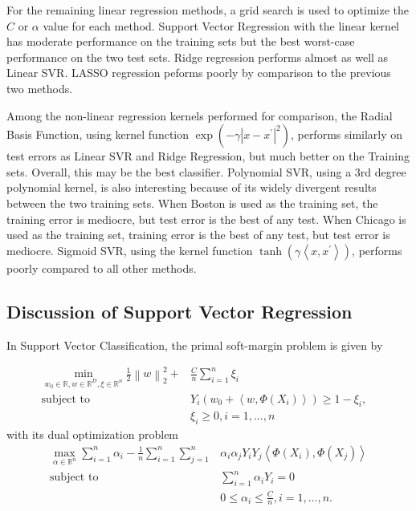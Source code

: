 \documentclass{article}
\begin{document}
For the remaining linear regression methods, a grid search is used to optimize the $C$ or $\alpha$ value for each method. Support Vector Regression with the linear kernel has moderate performance on the training sets but the best worst-case performance on the two test sets. Ridge regression performs almost as well as Linear SVR. LASSO regression peforms poorly by comparison to the previous two methods.

Among the non-linear regression kernels performed for comparison, the Radial Basis Function, using kernel function $\exp\left(-\gamma\left|x-x^\prime\right|^2\right)$, performs similarly on test errors as Linear SVR and Ridge Regression, but much better on the Training sets. Overall, this may be the best classifier. Polynomial SVR, using a 3rd degree polynomial kernel, is also interesting because of its widely divergent results between the two training sets. When Boston is used as the training set, the training error is mediocre, but test error is the best of any test. When Chicago is used as the training set, training error is the best of any test, but test error is mediocre. Sigmoid SVR, using the kernel function $\tanh\left(\gamma\left<x, x^\prime\right>\right)$, performs poorly compared to all other methods. 

\subsection{Discussion of Support Vector Regression}

In Support Vector Classification, the primal soft-margin problem is given by 

\begin{align*}
\min_{w_0\in\mathbb{R}, w\in\mathbb{R}^D, \xi\in\mathbb{R}^n}\frac{1}{2}\left\lVert w\right\rVert_2^2 + &\frac{C}{n}\sum_{i=1}^n\xi_i& \\ 
\text{subject to }&Y_i\left(w_0 + \left<w,\Phi(X_i)\right>\right) \geq 1 - \xi_i, \\
&\xi_i\geq 0, i = 1, ..., n
\end{align*}
with its dual optimization problem
\begin{align*}
\max_{\alpha\in\mathbb{R}^n}\sum_{i=1}^n\alpha_i - \frac{1}{n}\sum_{i=1}^n\sum_{j=1}^n&\alpha_i\alpha_jY_iY_j\left<\Phi(X_i), \Phi(X_j)\right> \\
\text{subject to }&\sum_{i=1}^n\alpha_iY_i=0 \\
&0 \leq \alpha_i \leq \frac{C}{n}, i=1, ... , n.
\end{align*}
\end{document}
